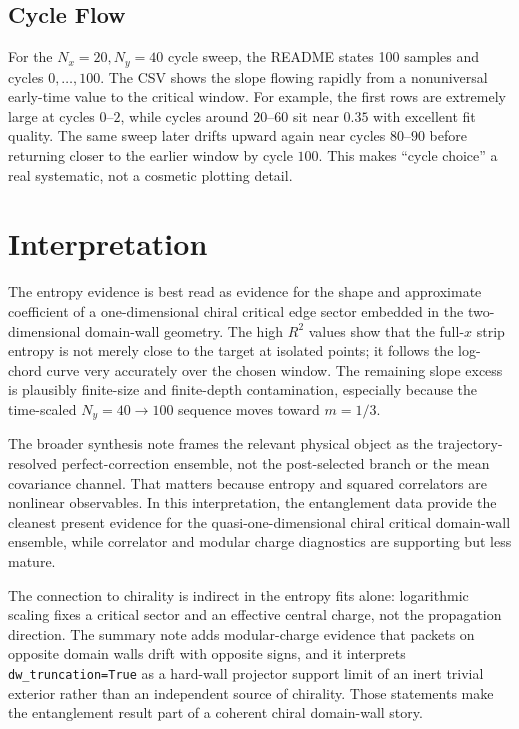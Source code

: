 \documentclass[aps,prb,onecolumn,nofootinbib,superscriptaddress]{revtex4-2}
\newcommand{\Ny}{N_y}
\newcommand{\Nx}{N_x}
\begin{document}
\subsection{Cycle Flow}

For the $\Nx=20,\Ny=40$ cycle sweep, the README states 100 samples and cycles $0,\ldots,100$.
The CSV shows the slope flowing rapidly from a nonuniversal early-time value to the
critical window.  For example, the first rows are extremely large at cycles $0$--$2$,
while cycles around $20$--$60$ sit near $0.35$ with excellent fit quality.  The same sweep
later drifts upward again near cycles $80$--$90$ before returning closer to the earlier
window by cycle $100$.  This makes ``cycle choice'' a real systematic, not a cosmetic
plotting detail.

\section{Interpretation}

The entropy evidence is best read as evidence for the shape and approximate coefficient of
a one-dimensional chiral critical edge sector embedded in the two-dimensional domain-wall
geometry.  The high $R^2$ values show that the full-$x$ strip entropy is not merely close to
the target at isolated points; it follows the log-chord curve very accurately over the
chosen window.  The remaining slope excess is plausibly finite-size and finite-depth
contamination, especially because the time-scaled $\Ny=40\to100$ sequence moves toward
$m=1/3$.

The broader synthesis note frames the relevant physical object as the trajectory-resolved
perfect-correction ensemble, not the post-selected branch or the mean covariance channel.
That matters because entropy and squared correlators are nonlinear observables.  In this
interpretation, the entanglement data provide the cleanest present evidence for the
quasi-one-dimensional chiral critical domain-wall ensemble, while correlator and modular
charge diagnostics are supporting but less mature.

The connection to chirality is indirect in the entropy fits alone: logarithmic scaling fixes
a critical sector and an effective central charge, not the propagation direction.  The
summary note adds modular-charge evidence that packets on opposite domain walls drift with
opposite signs, and it interprets \texttt{dw\_truncation=True} as a hard-wall projector
support limit of an inert trivial exterior rather than an independent source of chirality.
Those statements make the entanglement result part of a coherent chiral domain-wall story.
\end{document}
